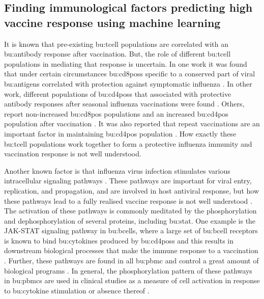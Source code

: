 \subsection{Finding immunological factors predicting high vaccine response using machine learning}

It is known that pre-existing \gls{bu:tcell} populations are correlated with an \gls{bu:antibody} response after vaccination.
But, the role of different \gls{bu:tcell} populations in mediating that response is uncertain.
In one work it was found that under certain circumstances \gls{bu:cd8pos}s specific to a conserved part of viral \gls{bu:antigen}s correlated with protection against symptomatic influenza \citep{sridharCellularImmuneCorrelates2013}.
In other work, different populations of \gls{bu:cd4pos}s that associated with protective antibody responses after seasonal influenza vaccinations were found \citep{bentebibelInductionICOSCXCR3}.
Others, report non-increased \gls{bu:cd8pos} populations and an increased \gls{bu:cd4pos} population after vaccination \citep{trieuLongtermMaintenanceInfluenzaSpecific2017}.
It was also reported that repeat vaccinations are an important factor in maintaining \gls{bu:cd4pos} population \citep{trieuLongtermMaintenanceInfluenzaSpecific2017}.
How exactly these \gls{bu:tcell} populations work together to form a protective influenza immunity and vaccination response is not well understood.

Another known factor is that influenza virus infection stimulates various intracellular signaling pathways \citep{Zhang_2019}.
These pathways are important for viral entry, replication, and propagation, and are involved in host antiviral response, but how these pathways lead to a fully realised vaccine response is not well understood \citep{Zhang_2018}.
The activation of these pathways is commonly meditated by the phosphorylation and dephosphorylation of several proteins, including \gls{bu:stat}.
One example is the JAK-STAT signaling pathway in \gls{bu:bcell}s, where a large set of \gls{bu:bcell} receptors is known to bind \gls{bu:cytokine}s produced by \gls{bu:cd4pos}s and this results in downstream biological processes that make the immune response to a vaccination \citep{Papin_2004}.
Further, these pathways are found in all \gls{bu:pbmc} and control a great amount of biological programs  \citep{Cantrell_2015}.
In general, the phosphorylation pattern of these pathways in \gls{bu:pbmc}s are used in clinical studies as a measure of cell activation in response to \gls{bu:cytokine} stimulation or absence thereof \citep{Toapanta_2012,tomicFluPRINTDatasetMultidimensional2019}.

